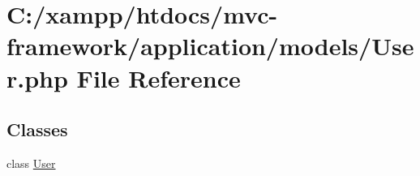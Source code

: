 \hypertarget{_user_8php}{}\section{C\+:/xampp/htdocs/mvc-\/framework/application/models/\+User.php File Reference}
\label{_user_8php}
\subsection*{Classes}
\begin{DoxyCompactItemize}
\item 
class \hyperlink{class_user}{User}
\end{DoxyCompactItemize}
